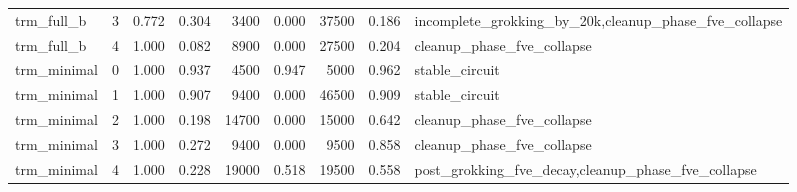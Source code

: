 \begin{longtable}{llrrrrrr p{2.4cm}}
trm\_full\_b & 3 & 0.772 & 0.304 & 3400 & 0.000 & 37500 & 0.186 & incomplete\_\allowbreak grokking\_\allowbreak by\_\allowbreak 20k,\allowbreak cleanup\_\allowbreak phase\_\allowbreak fve\_\allowbreak collapse \\
trm\_full\_b & 4 & 1.000 & 0.082 & 8900 & 0.000 & 27500 & 0.204 & cleanup\_\allowbreak phase\_\allowbreak fve\_\allowbreak collapse \\
trm\_minimal & 0 & 1.000 & 0.937 & 4500 & 0.947 & 5000 & 0.962 & stable\_\allowbreak circuit \\
trm\_minimal & 1 & 1.000 & 0.907 & 9400 & 0.000 & 46500 & 0.909 & stable\_\allowbreak circuit \\
trm\_minimal & 2 & 1.000 & 0.198 & 14700 & 0.000 & 15000 & 0.642 & cleanup\_\allowbreak phase\_\allowbreak fve\_\allowbreak collapse \\
trm\_minimal & 3 & 1.000 & 0.272 & 9400 & 0.000 & 9500 & 0.858 & cleanup\_\allowbreak phase\_\allowbreak fve\_\allowbreak collapse \\
trm\_minimal & 4 & 1.000 & 0.228 & 19000 & 0.518 & 19500 & 0.558 & post\_\allowbreak grokking\_\allowbreak fve\_\allowbreak decay,\allowbreak cleanup\_\allowbreak phase\_\allowbreak fve\_\allowbreak collapse \\
\bottomrule
\end{longtable}
\normalsize
